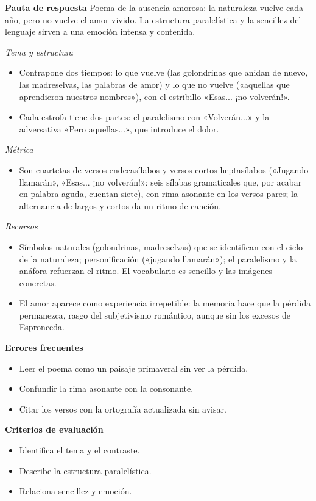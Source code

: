 \documentclass{book}
\begin{document}
\begin{tcolorbox}[title={Ejercicio resuelto}, studiumworked, breakable]
\noindent\textbf{Pauta de respuesta}
Poema de la ausencia amorosa: la naturaleza vuelve cada año, pero no vuelve el amor vivido. La estructura paralelística y la sencillez del lenguaje sirven a una emoción intensa y contenida.


\noindent\textit{Tema y estructura}
\begin{itemize}
\item Contrapone dos tiempos: lo que vuelve (las golondrinas que anidan de nuevo, las madreselvas, las palabras de amor) y lo que no vuelve («aquellas que aprendieron nuestros nombres»), con el estribillo «Esas... ¡no volverán!».
\item Cada estrofa tiene dos partes: el paralelismo con «Volverán...» y la adversativa «Pero aquellas...», que introduce el dolor.
\end{itemize}

\noindent\textit{Métrica}
\begin{itemize}
\item Son cuartetas de versos endecasílabos y versos cortos heptasílabos («Jugando llamarán», «Esas... ¡no volverán!»: seis sílabas gramaticales que, por acabar en palabra aguda, cuentan siete), con rima asonante en los versos pares; la alternancia de largos y cortos da un ritmo de canción.
\end{itemize}

\noindent\textit{Recursos}
\begin{itemize}
\item Símbolos naturales (golondrinas, madreselvas) que se identifican con el ciclo de la naturaleza; personificación («jugando llamarán»); el paralelismo y la anáfora refuerzan el ritmo. El vocabulario es sencillo y las imágenes concretas.
\item El amor aparece como experiencia irrepetible: la memoria hace que la pérdida permanezca, rasgo del subjetivismo romántico, aunque sin los excesos de Espronceda.
\end{itemize}

\noindent\textbf{Errores frecuentes}
\begin{itemize}
\item Leer el poema como un paisaje primaveral sin ver la pérdida.
\item Confundir la rima asonante con la consonante.
\item Citar los versos con la ortografía actualizada sin avisar.
\end{itemize}

\noindent\textbf{Criterios de evaluación}
\begin{itemize}
\item Identifica el tema y el contraste.
\item Describe la estructura paralelística.
\item Relaciona sencillez y emoción.
\end{itemize}
\end{tcolorbox}
\end{document}
